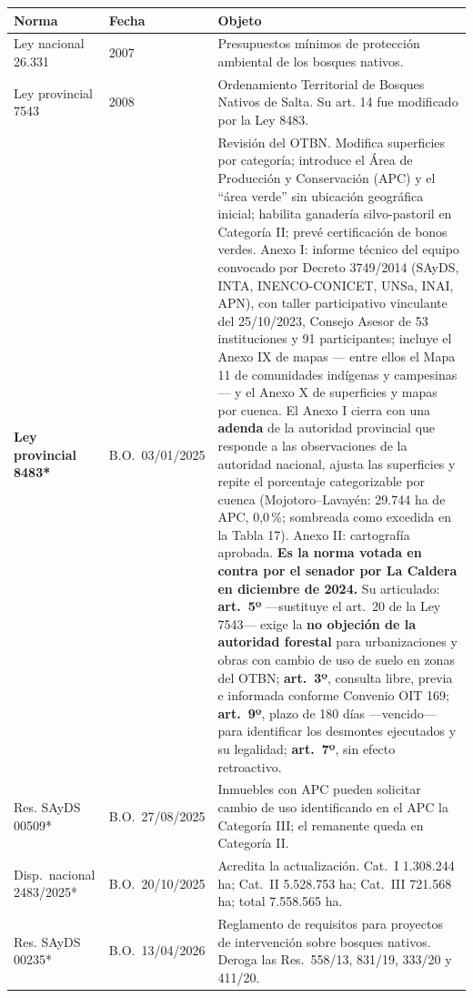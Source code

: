 \begin{longtable}{@{}p{3.2cm}p{1.9cm}p{7.9cm}@{}}
\toprule
\textbf{Norma} & \textbf{Fecha} & \textbf{Objeto} \\
\midrule
\endhead
Ley nacional 26.331 & 2007 & Presupuestos mínimos de protección ambiental de los bosques nativos. \\
Ley provincial 7543 & 2008 & Ordenamiento Territorial de Bosques Nativos de Salta. Su art. 14 fue modificado por la Ley 8483. \\
\textbf{Ley provincial 8483*} & B.O.\ 03/01/2025 & Revisión del OTBN. Modifica superficies por categoría; introduce el Área de Producción y Conservación (APC) y el ``área verde'' sin ubicación geográfica inicial; habilita ganadería silvo-pastoril en Categoría II; prevé certificación de bonos verdes. Anexo I: informe técnico del equipo convocado por Decreto 3749/2014 (SAyDS, INTA, INENCO-CONICET, UNSa, INAI, APN), con taller participativo vinculante del 25/10/2023, Consejo Asesor de 53 instituciones y 91 participantes; incluye el Anexo IX de mapas --- entre ellos el Mapa 11 de comunidades indígenas y campesinas --- y el Anexo X de superficies y mapas por cuenca. El Anexo I cierra con una \textbf{adenda} de la autoridad provincial que responde a las observaciones de la autoridad nacional, ajusta las superficies y repite el porcentaje categorizable por cuenca (Mojotoro--Lavayén: 29.744 ha de APC, 0,0\,\%; sombreada como excedida en la Tabla 17). Anexo II: cartografía aprobada. \textbf{Es la norma votada en contra por el senador por La Caldera en diciembre de 2024.} Su articulado: \textbf{art.\ 5º} ---sustituye el art.\ 20 de la Ley 7543--- exige la \textbf{no objeción de la autoridad forestal} para urbanizaciones y obras con cambio de uso de suelo en zonas del OTBN; \textbf{art.\ 3º}, consulta libre, previa e informada conforme Convenio OIT 169; \textbf{art.\ 9º}, plazo de 180 días ---vencido--- para identificar los desmontes ejecutados y su legalidad; \textbf{art.\ 7º}, sin efecto retroactivo. \\
Res. SAyDS 00509* & B.O.\ 27/08/2025 & Inmuebles con APC pueden solicitar cambio de uso identificando en el APC la Categoría III; el remanente queda en Categoría II. \\
Disp.\ nacional 2483/2025* & B.O.\ 20/10/2025 & Acredita la actualización. Cat.\ I 1.308.244 ha; Cat.\ II 5.528.753 ha; Cat.\ III 721.568 ha; total 7.558.565 ha. \\
Res. SAyDS 00235* & B.O.\ 13/04/2026 & Reglamento de requisitos para proyectos de intervención sobre bosques nativos. Deroga las Res.\ 558/13, 831/19, 333/20 y 411/20. \\

\end{longtable}
